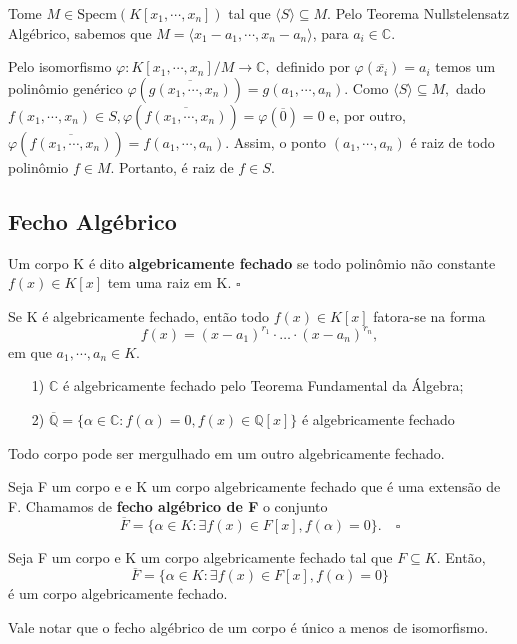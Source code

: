 \documentclass[AlgebraII/algebraII_notes.tex]{subfiles}
\begin{document}
\begin{proof*}
	Tome \(M\in \mathrm{Specm}(K[x_{1}, \cdots, x_{n}])\) tal que \(\langle S \rangle \subseteq{M}.\) Pelo Teorema
	Nullstelensatz Algébrico, sabemos que \(M = \langle x_{1}-a_{1}, \cdots, x_{n}-a_{n} \rangle\), para \(a_{i}\in \mathbb{C}.\)

	Pelo isomorfismo \(\varphi :K[x_{1}, \cdots, x_{n}]/M\rightarrow \mathbb{C},\) definido por \(\varphi (\overline{x_{i}}) = a_{i}\) temos
	um polinômio genérico \(\varphi (\overline{g(x_{1}, \cdots, x_{n})}) = g(a_{1}, \cdots, a_{n}).\) Como \(\langle S \rangle \subseteq{M},\)
	dado \(f(x_{1}, \cdots, x_{n})\in S, \varphi (\overline{f(x_{1}, \cdots, x_{n})})=\varphi (\overline{0}) = 0\) e, por outro, \(\varphi (\overline{f(x_{1}, \cdots, x_{n})}) =
	f(a_{1}, \cdots, a_{n}).\) Assim, o ponto \((a_{1}, \cdots, a_{n})\) é raiz de todo polinômio \(f\in M\). Portanto,
	é raiz de \(f\in S.\) \qedsymbol
\end{proof*}
\subsection{Fecho Algébrico}
\begin{def*}
	Um corpo K é dito \textbf{algebricamente fechado} se todo polinômio não constante \(f(x)\in K[x]\) tem
	uma raiz em K. \(\square\)
\end{def*}
\begin{lemma*}
	Se K é algebricamente fechado, então todo \(f(x)\in K[x]\) fatora-se na forma
	\[
		f(x) = (x-a_{1})^{r_{1}}\cdot \dotsc \cdot (x-a_{n})^{r_{n}},
	\]
	em que \(a_{1}, \cdots, a_{n}\in K\).
\end{lemma*}
\begin{example}
	\begin{itemize}
		\item[1)] \(\mathbb{C}\) é algebricamente fechado pelo Teorema Fundamental da Álgebra;
		\item[2)] \(\overline{\mathbb{Q}} = \{\alpha \in \mathbb{C}: f(\alpha ) = 0, f(x)\in \mathbb{Q}[x]\}\) é algebricamente fechado
	\end{itemize}
\end{example}
Todo corpo pode ser mergulhado em um outro algebricamente fechado.
\begin{def*}
	Seja F um corpo e e K um corpo algebricamente fechado que é uma extensão de F. Chamamos de
	\textbf{fecho algébrico de F} o conjunto
	\[
		\overline{F} = \{\alpha \in K: \exists f(x)\in F[x], f(\alpha ) = 0\}.\quad\square
	\]
\end{def*}
\begin{prop*}
	Seja F um corpo e K um corpo algebricamente fechado tal que \(F \subseteq{K}.\) Então,
	\[
		\overline{F} = \{\alpha \in K: \exists f(x)\in F[x], f(\alpha ) = 0\}
	\]
	é um corpo algebricamente fechado.
\end{prop*}
Vale notar que o fecho algébrico de um corpo é único a menos de isomorfismo.
\end{document}
